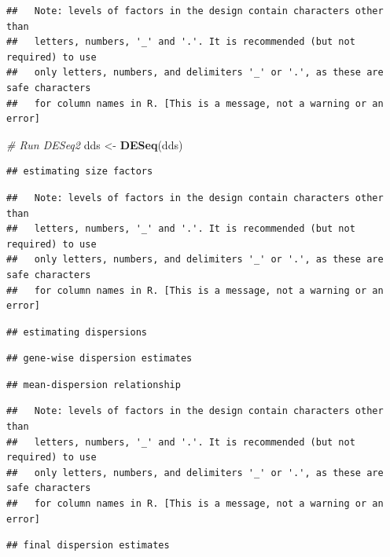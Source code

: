 \documentclass[
]{article}
\newenvironment{Shaded}{\begin{snugshade}}{\end{snugshade}}
\newcommand{\CommentTok}[1]{\textcolor[rgb]{0.56,0.35,0.01}{\textit{#1}}}
\newcommand{\FunctionTok}[1]{\textcolor[rgb]{0.13,0.29,0.53}{\textbf{#1}}}
\newcommand{\NormalTok}[1]{#1}
\newcommand{\OtherTok}[1]{\textcolor[rgb]{0.56,0.35,0.01}{#1}}
\begin{document}
\begin{verbatim}
##   Note: levels of factors in the design contain characters other than
##   letters, numbers, '_' and '.'. It is recommended (but not required) to use
##   only letters, numbers, and delimiters '_' or '.', as these are safe characters
##   for column names in R. [This is a message, not a warning or an error]
\end{verbatim}

\begin{Shaded}
\begin{Highlighting}[]
\CommentTok{\# Run DESeq2}
\NormalTok{dds }\OtherTok{\textless{}{-}} \FunctionTok{DESeq}\NormalTok{(dds)}
\end{Highlighting}
\end{Shaded}

\begin{verbatim}
## estimating size factors
\end{verbatim}

\begin{verbatim}
##   Note: levels of factors in the design contain characters other than
##   letters, numbers, '_' and '.'. It is recommended (but not required) to use
##   only letters, numbers, and delimiters '_' or '.', as these are safe characters
##   for column names in R. [This is a message, not a warning or an error]
\end{verbatim}

\begin{verbatim}
## estimating dispersions
\end{verbatim}

\begin{verbatim}
## gene-wise dispersion estimates
\end{verbatim}

\begin{verbatim}
## mean-dispersion relationship
\end{verbatim}

\begin{verbatim}
##   Note: levels of factors in the design contain characters other than
##   letters, numbers, '_' and '.'. It is recommended (but not required) to use
##   only letters, numbers, and delimiters '_' or '.', as these are safe characters
##   for column names in R. [This is a message, not a warning or an error]
\end{verbatim}

\begin{verbatim}
## final dispersion estimates
\end{verbatim}
\end{document}

